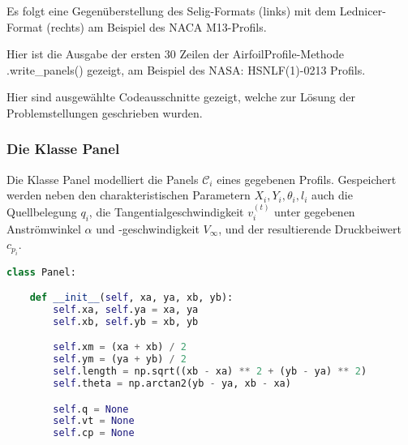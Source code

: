 \appendix

\label{appendix:a}

Es folgt eine Gegenüberstellung des Selig-Formats (links) mit dem Lednicer-Format (rechts) am Beispiel des NACA M13-Profils.

\begin{minipage}{0.45\textwidth}

\end{minipage}
    \hfill
\begin{minipage}{0.45\textwidth}

\end{minipage}

\newpage
{}
\label{appendix:b}
Hier ist die Ausgabe der ersten 30 Zeilen der AirfoilProfile-Methode .write\_panels() gezeigt, am Beispiel des NASA: HSNLF(1)-0213 Profils.



\newpage
{}
\label{appendix:c}
Hier sind ausgewählte Codeausschnitte gezeigt, welche zur Lösung der Problemstellungen geschrieben wurden.
\subsubsection{Die Klasse Panel}
Die Klasse Panel modelliert die Panels $\mathcal{C}_i$ eines gegebenen Profils. Gespeichert werden neben den charakteristischen Parametern $X_i, Y_i, \theta _i, l_i$ auch die Quellbelegung $q_i$, die Tangentialgeschwindigkeit $v_i^{(t)}$ unter gegebenen Anströmwinkel $\alpha $ und -geschwindigkeit $V_{\infty}$, und der resultierende Druckbeiwert $c_{p_i}$.
\begin{lstlisting}[language=Python]
class Panel:

    def __init__(self, xa, ya, xb, yb):
        self.xa, self.ya = xa, ya
        self.xb, self.yb = xb, yb

        self.xm = (xa + xb) / 2
        self.ym = (ya + yb) / 2
        self.length = np.sqrt((xb - xa) ** 2 + (yb - ya) ** 2)
        self.theta = np.arctan2(yb - ya, xb - xa)

        self.q = None
        self.vt = None
        self.cp = None
\end{lstlisting}

